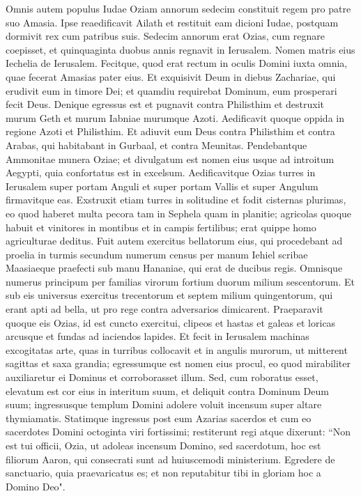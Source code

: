 \begin{biblechapter}  
\verse Omnis autem populus Iudae Oziam annorum sedecim constituit regem pro patre suo Amasia. 
\verse Ipse reaedificavit Ailath et restituit eam dicioni Iudae, postquam dormivit rex cum patribus suis. 
\verse Sedecim annorum erat Ozias, cum regnare coepisset, et quinquaginta duobus annis regnavit in Ierusalem. Nomen matris eius Iechelia de Ierusalem. 
\verse Fecitque, quod erat rectum in oculis Domini iuxta omnia, quae fecerat Amasias pater eius. 
\verse Et exquisivit Deum in diebus Zachariae, qui erudivit eum in timore Dei; et quamdiu requirebat Dominum, eum prosperari fecit Deus. 
\verse Denique egressus est et pugnavit contra Philisthim et destruxit murum Geth et murum Iabniae murumque Azoti. Aedificavit quoque oppida in regione Azoti et Philisthim. 
\verse Et adiuvit eum Deus contra Philisthim et contra Arabas, qui habitabant in Gurbaal, et contra Meunitas. 
\verse Pendebantque Ammonitae munera Oziae; et divulgatum est nomen eius usque ad introitum Aegypti, quia confortatus est in excelsum. 
\verse Aedificavitque Ozias turres in Ierusalem super portam Anguli et super portam Vallis et super Angulum firmavitque eas. 
\verse Exstruxit etiam turres in solitudine et fodit cisternas plurimas, eo quod haberet multa pecora tam in Sephela quam in planitie; agricolas quoque habuit et vinitores in montibus et in campis fertilibus; erat quippe homo agriculturae deditus. 
\verse Fuit autem exercitus bellatorum eius, qui procedebant ad proelia in turmis secundum numerum census per manum Iehiel scribae Maasiaeque praefecti sub manu Hananiae, qui erat de ducibus regis. 
\verse Omnisque numerus principum per familias virorum fortium duorum milium sescentorum. 
\verse Et sub eis universus exercitus trecentorum et septem milium quingentorum, qui erant apti ad bella, ut pro rege contra adversarios dimicarent. 
\verse Praeparavit quoque eis Ozias, id est cuncto exercitui, clipeos et hastas et galeas et loricas arcusque et fundas ad iaciendos lapides. 
\verse Et fecit in Ierusalem machinas excogitatas arte, quas in turribus collocavit et in angulis murorum, ut mitterent sagittas et saxa grandia; egressumque est nomen eius procul, eo quod mirabiliter auxiliaretur ei Dominus et corroborasset illum. 
\verse Sed, cum roboratus esset, elevatum est cor eius in interitum suum, et deliquit contra Dominum Deum suum; ingressusque templum Domini adolere voluit incensum super altare thymiamatis. 
\verse Statimque ingressus post eum Azarias sacerdos et cum eo sacerdotes Domini octoginta viri fortissimi; 
\verse restiterunt regi atque dixerunt: “Non est tui officii, Ozia, ut adoleas incensum Domino, sed sacerdotum, hoc est filiorum Aaron, qui consecrati sunt ad huiuscemodi ministerium. Egredere de sanctuario, quia praevaricatus es; et non reputabitur tibi in gloriam hoc a Domino Deo". 

\end{biblechapter}
